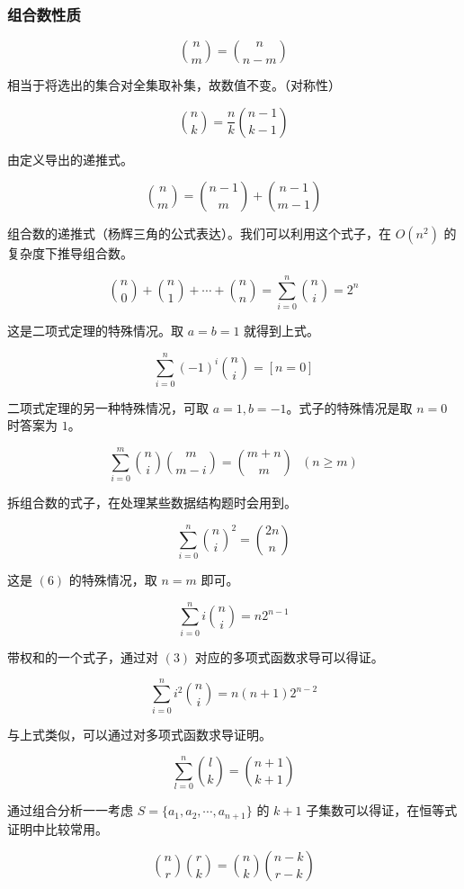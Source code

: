 \subsubsection*{组合数性质}

\[
\binom{n}{m}=\binom{n}{n-m}\tag{1}
\]

相当于将选出的集合对全集取补集，故数值不变。（对称性）

\[
\binom{n}{k} = \frac{n}{k} \binom{n-1}{k-1}\tag{2}
\]

由定义导出的递推式。

\[
\binom{n}{m}=\binom{n-1}{m}+\binom{n-1}{m-1}\tag{3}
\]

组合数的递推式（杨辉三角的公式表达）。我们可以利用这个式子，在 \( O(n^2) \) 的复杂度下推导组合数。

\[
\binom{n}{0}+\binom{n}{1}+\cdots+\binom{n}{n}=\sum_{i=0}^n\binom{n}{i}=2^n\tag{4}
\]

这是二项式定理的特殊情况。取 \( a=b=1 \) 就得到上式。

\[
\sum_{i=0}^n(-1)^i\binom{n}{i}=[n=0]\tag{5}
\]

二项式定理的另一种特殊情况，可取 \( a=1, b=-1 \)。式子的特殊情况是取 \( n=0 \) 时答案为 \( 1 \)。

\[
\sum_{i=0}^m \binom{n}{i}\binom{m}{m-i} = \binom{m+n}{m}\ \ \ (n \geq m)\tag{6}
\]

拆组合数的式子，在处理某些数据结构题时会用到。

\[
\sum_{i=0}^n\binom{n}{i}^2=\binom{2n}{n}\tag{7}
\]

这是 \( (6) \) 的特殊情况，取 \( n=m \) 即可。

\[
\sum_{i=0}^ni\binom{n}{i}=n2^{n-1}\tag{8}
\]

带权和的一个式子，通过对 \( (3) \) 对应的多项式函数求导可以得证。

\[
\sum_{i=0}^ni^2\binom{n}{i}=n(n+1)2^{n-2}\tag{9}
\]

与上式类似，可以通过对多项式函数求导证明。

\[
\sum_{l=0}^n\binom{l}{k} = \binom{n+1}{k+1}\tag{10}
\]

通过组合分析一一考虑 \( S=\{a_1, a_2, \cdots, a_{n+1}\} \) 的 \( k+1 \) 子集数可以得证，在恒等式证明中比较常用。

\[
\binom{n}{r}\binom{r}{k} = \binom{n}{k}\binom{n-k}{r-k}\tag{11}
\]

